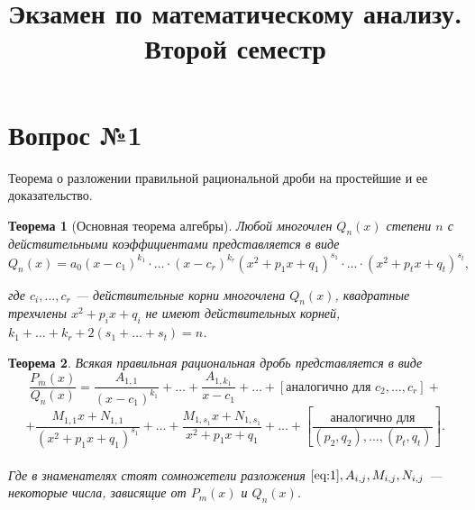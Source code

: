 \documentclass[12pt]{report}
\title{Экзамен по математическому анализу.\\Второй семестр}
\date{}
\numberwithin{equation}{section}
\newtheorem{theorem}{Теорема}[section]
\begin{document}
\maketitle
\tableofcontents

\thispagestyle{empty}


\newpage \section{Вопрос №1}  %
\begin{framed}
Теорема о разложении правильной рациональной дроби на простейшие и ее доказательство.\\
\end{framed}
\begin{theorem}[Основная теорема алгебры] Любой многочлен $Q_n(x)$ степени $n$ с действительными коэффициентами представляется в виде
\begin{equation}  \label{eq:1}
Q_n(x) = a_0(x-c_1)^{k_1} \cdot \ldots \cdot (x-c_r)^{k_r}(x^2 + p_1x + q_1)^{s_1} \cdot \ldots \cdot (x^2 + p_tx + q_t)^{s_t},
\end{equation}

где $c_i , \ldots , c_r$ — действительные корни многочлена $Q_n(x)$, квадратные трехчлены $x^2 + p_i x + q_i$ не имеют действительных корней, $k_1 + \dots + k_r + 2(s_1 + \dots + s_t) = n$. 
\end{theorem}


\begin{theorem}
Всякая правильная рациональная дробь представляется в виде
\[ \frac{P_m(x)}{Q_n(x)} = \frac{A_{1,1}}{(x-c_1)^{k_1}} + \dots + \frac{A_{1,k_1}}{x-c_1} + \dots + \left[ \text{аналогично для }c_2, \ldots, c_r\right] + \]
\[ + \frac{M_{1,1}x + N_{1,1}}{(x^2 + p_1x + q_1)^{s_1}} + \dots + \frac{M_{1,s_1}x + N_{1,s_1}}{x^2 + p_1x + q_1} + \dots + \left[ \frac{\text{аналогично для}}{(p_2,q_2), \ldots, (p_t,q_t)}\right]. \]\\

Где в знаменателях стоят сомножетели разложения $\eqref{eq:1}, A_{i,j} , M_{i,j} , N_{i,j}$ — некоторые
числа, зависящие от $P_m(x)$ и $Q_n(x)$.
\end{theorem}
\end{document}
